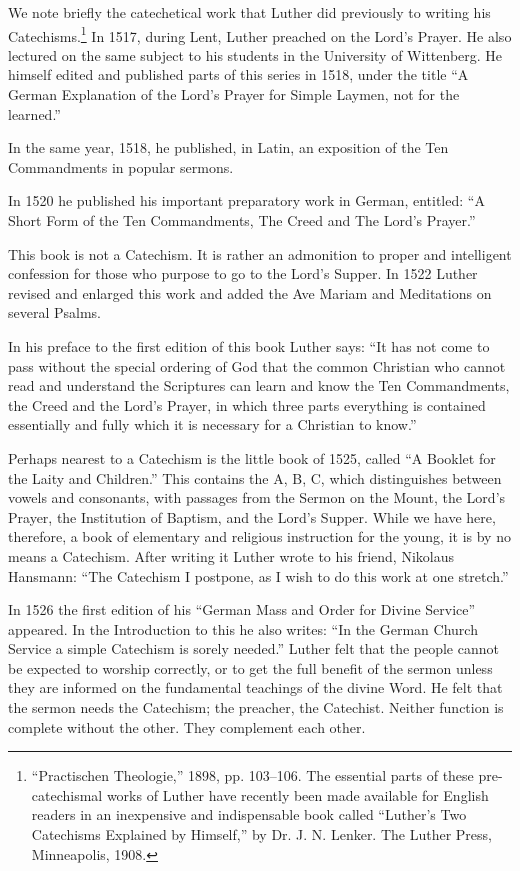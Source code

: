 We note briefly the catechetical work that Luther did previously to writing his Catechisms.\footnote{“Practischen Theologie,” 1898, pp. 103–106. The essential parts of these pre-catechismal works of Luther have recently been made available for English readers in an inexpensive and indispensable book called “Luther’s Two Catechisms Explained by Himself,” by Dr. J. N. Lenker. The Luther Press, Minneapolis, 1908.}
 In 1517, during Lent, Luther preached on the Lord’s Prayer. He also lectured on the same subject to his students in the University of Wittenberg. He himself edited and published parts of this series in 1518, under the title “A German Explanation of the Lord’s Prayer for Simple Laymen, not for the learned.”

In the same year, 1518, he published, in Latin, an exposition of the Ten Commandments in popular sermons.

In 1520 he published his important preparatory work in German, entitled: “A Short Form of the Ten Commandments, The Creed and The Lord’s Prayer.”

This book is not a Catechism. It is rather an admonition to proper and intelligent confession for those who purpose to go to the Lord’s Supper. In 1522 Luther revised and enlarged this work and added the Ave Mariam and Meditations on several Psalms.

In his preface to the first edition of this book Luther says: “It has not come to pass without the special ordering of God that the common Christian who cannot read and understand the Scriptures can learn and know the Ten Commandments, the Creed and the Lord’s Prayer, in which three parts everything is contained essentially and fully which it is necessary for a Christian to know.”

 Perhaps nearest to a Catechism is the little book of 1525, called “A Booklet for the Laity and Children.” This contains the A, B, C, which distinguishes between vowels and consonants, with passages from the Sermon on the Mount, the Lord’s Prayer, the Institution of Baptism, and the Lord’s Supper. While we have here, therefore, a book of elementary and religious instruction for the young, it is by no means a Catechism. After writing it Luther wrote to his friend, Nikolaus Hansmann: “The Catechism I postpone, as I wish to do this work at one stretch.”

In 1526 the first edition of his “German Mass and Order for Divine Service” appeared. In the Introduction to this he also writes: “In the German Church Service a simple Catechism is sorely needed.” Luther felt that the people cannot be expected to worship correctly, or to get the full benefit of the sermon unless they are informed on the fundamental teachings of the divine Word. He felt that the sermon needs the Catechism; the preacher, the Catechist. Neither function is complete without the other. They complement each other.

